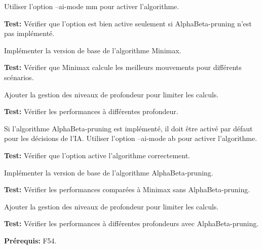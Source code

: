 \documentclass{article}
\begin{document}
\begin{needbox}
    \begin{subneedbox}
        Utiliser l'option --ai-mode mm pour activer l'algorithme.

        \textbf{Test:} Vérifier que l'option est bien active seulement si AlphaBeta-pruning n'est pas implémenté.
    \end{subneedbox}
    
    \begin{subneedbox}
        Implémenter la version de base de l’algorithme Minimax.

        \textbf{Test:} Vérifier que Minimax calcule les meilleurs mouvements pour différents scénarios.
    \end{subneedbox}
    
    \begin{subneedbox}
        Ajouter la gestion des niveaux de profondeur pour limiter les calculs.

        \textbf{Test:} Vérifier les performances à différentes profondeur.
    \end{subneedbox}
\end{needbox}

\begin{needbox}
    \begin{subneedbox}
        Si l'algorithme AlphaBeta-pruning est implémenté, il doit être activé par défaut pour les décisions de l'IA.
        Utiliser l'option --ai-mode ab pour activer l’algorithme.

        \textbf{Test:} Vérifier que l'option active l'algorithme correctement.
    \end{subneedbox}
    
    \begin{subneedbox}
        Implémenter la version de base de l’algorithme AlphaBeta-pruning.

        \textbf{Test:} Vérifier les performances comparées à Minimax sans AlphaBeta-pruning.
    \end{subneedbox}
    
    \begin{subneedbox}
        Ajouter la gestion des niveaux de profondeur pour limiter les calculs.

        \textbf{Test:} Vérifier les performances à différentes profondeurs avec AlphaBeta-pruning.
    \end{subneedbox}
    \textbf{Prérequis:} F54.
\end{needbox}
\end{document}
